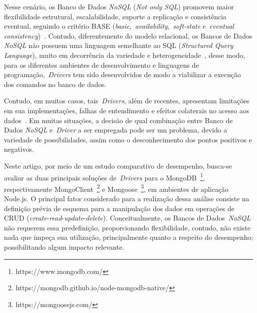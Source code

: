 \documentclass[12pt]{article}
\begin{document}
Nesse cenário, os Banco de Dados \textit{NoSQL} (\emph{Not only SQL}) promovem maior flexibilidade estrutural, escalabilidade, suporte a replicação e consistência eventual, seguindo o critério BASE (\textit{basic},~\textit{availability},~\textit{soft-state} e~\textit{eventual consistency})~\cite{han2011survey}. 
Contudo, diferentemente do modelo relacional, os Bancos de Dados \textit{NoSQL} não possuem uma linguagem semelhante ao SQL (\emph{Structured Query Language}), muito em decorrência da variedade e heterogeneidade~\cite{bugiotti2013object,sellami2014odbapi}, desse modo, para os diferentes ambientes de desenvolvimento e linguagens de programação,~\emph{Drivers} tem sido desenvolvidos de modo a viabilizar a execução dos comandos no banco de dados. 

Contudo, em muitos casos, tais~\emph{Drivers}, além de recentes, apresentam limitações em sua implementações, falhas de entendimento e efeitos colaterais no acesso aos dados~\cite{rafique2018performance}.
Em muitas situações, a decisão de qual combinação entre Banco de Dados \textit{NoSQL} e~\emph{Driver} a ser empregada pode ser um problema, devido a variedade de possibilidades, assim como o desconhecimento dos pontos positivos e negativos. 

Neste artigo, por meio de um estudo comparativo de desempenho, busca-se avaliar as duas principais soluções de~\emph{Drivers} para o MongoDB~\footnote{https://www.mongodb.com/}, respectivamente MongoClient~\footnote{https://mongodb.github.io/node-mongodb-native/} e Mongoose~\footnote{https://mongoosejs.com/}, em ambientes de aplicação Node.js. 
O principal fator considerado para a realização dessa análise consiste na definição prévia de esquema para a manipulação dos dados em operações de CRUD (\emph{create}-\emph{read}-\emph{update}-\emph{delete}). Conceitualmente, os Bancos de Dados~\textit{NoSQL} não requerem essa predefinição, proporcionando flexibilidade, contudo, não existe nada que impeça sua utilização, principalmente quanto a respeito do desempenho; possibilitando algum impacto relevante.
\end{document}
